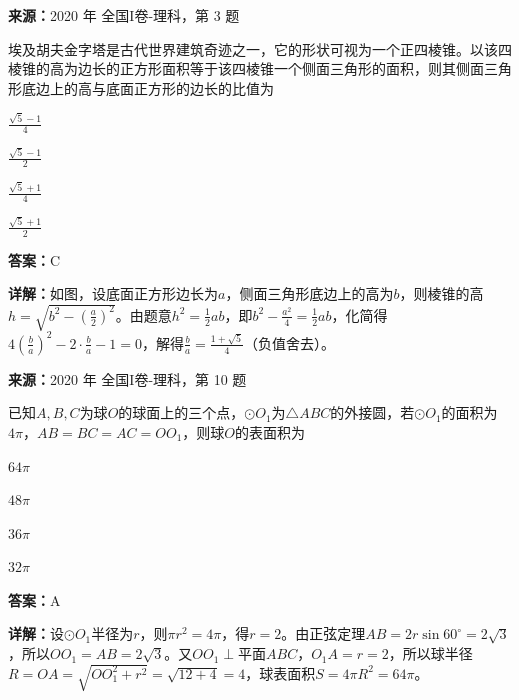 \begin{question}[points=5]
\textbf{来源：}2020 年 全国I卷-理科，第 3 题\par
埃及胡夫金字塔是古代世界建筑奇迹之一，它的形状可视为一个正四棱锥。以该四棱锥的高为边长的正方形面积等于该四棱锥一个侧面三角形的面积，则其侧面三角形底边上的高与底面正方形的边长的比值为
\begin{choices}
  \item $\frac{\sqrt{5}-1}{4}$
  \item $\frac{\sqrt{5}-1}{2}$
  \item $\frac{\sqrt{5}+1}{4}$
  \item $\frac{\sqrt{5}+1}{2}$
\end{choices}
\begin{solution}
\textbf{答案：}C

\textbf{详解：}如图，设底面正方形边长为$a$，侧面三角形底边上的高为$b$，则棱锥的高$h=\sqrt{b^2-\left(\frac{a}{2}\right)^2}$。由题意$h^2=\frac{1}{2}ab$，即$b^2-\frac{a^2}{4}=\frac{1}{2}ab$，化简得$4\left(\frac{b}{a}\right)^2-2\cdot\frac{b}{a}-1=0$，解得$\frac{b}{a}=\frac{1+\sqrt{5}}{4}$（负值舍去）。
\end{solution}
\end{question}

\begin{question}[points=5]
\textbf{来源：}2020 年 全国I卷-理科，第 10 题\par
已知$A,B,C$为球$O$的球面上的三个点，$\odot O_1$为$\triangle ABC$的外接圆，若$\odot O_1$的面积为$4\pi$，$AB=BC=AC=OO_1$，则球$O$的表面积为
\begin{choices}
  \item $64\pi$
  \item $48\pi$
  \item $36\pi$
  \item $32\pi$
\end{choices}
\begin{solution}
\textbf{答案：}A

\textbf{详解：}设$\odot O_1$半径为$r$，则$\pi r^2=4\pi$，得$r=2$。由正弦定理$AB=2r\sin60^\circ=2\sqrt{3}$，所以$OO_1=AB=2\sqrt{3}$。又$OO_1\perp$平面$ABC$，$O_1A=r=2$，所以球半径$R=OA=\sqrt{OO_1^2+r^2}=\sqrt{12+4}=4$，球表面积$S=4\pi R^2=64\pi$。
\end{solution}
\end{question}

